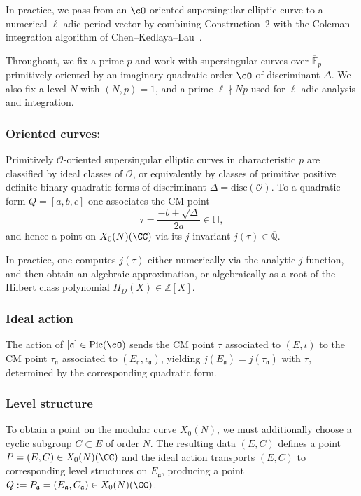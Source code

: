 \documentclass[10pt]{amsart}
\theoremstyle{theostyle}
\newcommand{\FF}{\mathbb{F}} \newcommand{\HH}{\mathbb{H}}
\newcommand{\QQ}{\mathbb{Q}} \newcommand{\RR}{\mathbb{R}}
\newcommand{\ZZ}{\mathbb{Z}}
\newcommand{\disc}{\mathrm{disc}}
\renewcommand{\fa}{\mathfrak{a}} \newcommand{\fb}{\mathfrak{b}} \newcommand{\fc}{\mathfrak{c}}
\newcommand{\Pic}{\mathrm{Pic}}
\begin{document}
In practice, we pass from an $\cO$-oriented supersingular elliptic curve to a
numerical $\ell$-adic period vector by combining Construction~2 with the
Coleman-integration algorithm of Chen--Kedlaya--Lau~\cite[\S~3]{CKL}.

Throughout, we fix a prime $p$ and work with supersingular
curves over $\overline{\FF}_{p}$ primitively oriented
by an imaginary quadratic order $\cO$ of discriminant $\Delta$.
We also fix a level $N$ with $(N,p)=1$, and a prime
$\ell\nmid Np$ used for $\ell$-adic analysis and %
integration.

\subsubsection*{Oriented curves: }Primitively $\mathcal O$-oriented
supersingular elliptic curves in characteristic $p$ are classified
by ideal classes of $\mathcal O$, or equivalently by classes of primitive
positive definite binary quadratic forms of discriminant
$\Delta=\disc(\mathcal O)$.
To a quadratic
form $Q=[a,b,c]$ one associates the CM point \cite{Stange:QuadForms}
\[
\tau=\frac{-b+\sqrt{\Delta}}{2a}\in\HH,
\]
and hence a point on $X_0(N)(\CC)$ via its $j$-invariant $j(\tau)\in\overline{\QQ}$.

In practice, one computes $j(\tau)$ either numerically via the analytic
$j$-function, and then obtain an algebraic approximation, or algebraically as a root of the Hilbert class
polynomial $H_D(X)\in\ZZ[X]$.  

\subsubsection*{Ideal action}
The action of $[\fa]\in\Pic(\cO)$ sends the CM point
$\tau$ associated to $(E,\iota)$ to the CM point $\tau_\fa$ associated to
$(E_\fa,\iota_\fa)$, yielding $j(E_\fa)=j(\tau_\fa)$ with $\tau_\fa$ determined by the corresponding quadratic form.

\subsubsection*{Level structure}
To obtain a point on the modular curve $X_0(N)$, we must additionally choose a
cyclic subgroup $C\subset E$ of order $N$. 
The resulting data $(E,C)$ defines a point $P=(E,C)\in X_0(N)(\CC)$
and the ideal action transports $(E,C)$ to corresponding level structures on
$E_\fa$, producing a point $Q:=P_\fa=(E_\fa,C_\fa)\in X_0(N)(\CC)$.
\end{document}
